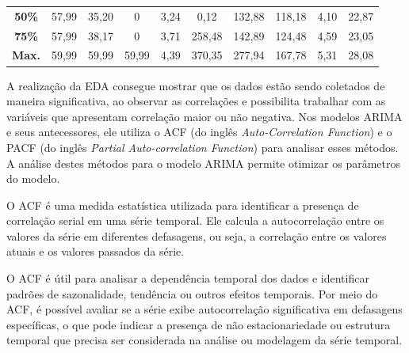 \begin{table}[!htb]
\begin{tabular}{@{}cccccccccc@{}}
\textbf{50\%}                          & 57,99                           & 35,20                           & 0                               & 3,24                              & 0,12                              & 132,88                            & 118,18                            & 4,10                              & 22,87                             \\
\textbf{75\%}                          & 57,99                           & 38,17                           & 0                               & 3,71                              & 258,48                            & 142,89                            & 124,48                            & 4,59                              & 23,05                             \\
\textbf{Max.}                          & 59,99                           & 59,99                           & 59,99                           & 4,39                              & 370,35                            & 277,94                            & 167,78                            & 5,31                              & 28,08                             \\ \bottomrule
	\end{tabular}
	
	
\end{table}



A realização da EDA consegue mostrar que os dados estão sendo coletados de maneira significativa, ao observar as correlações e possibilita trabalhar com as variáveis que apresentam correlação maior ou não negativa. Nos modelos ARIMA e seus antecessores, ele utiliza o ACF (do inglês \textit{\textit{Auto-Correlation Function}}) e o PACF (do inglês \textit{Partial Auto-correlation Function}) para analisar esses métodos. A análise destes métodos para o modelo ARIMA permite otimizar os parâmetros do modelo.

O ACF é uma medida estatística utilizada para identificar a presença de correlação serial em uma série temporal. Ele calcula a autocorrelação entre os valores da série em diferentes defasagens, ou seja, a correlação entre os valores atuais e os valores passados da série. 

O ACF é útil para analisar a dependência temporal dos dados e identificar padrões de sazonalidade, tendência ou outros efeitos temporais. Por meio do ACF, é possível avaliar se a série exibe autocorrelação significativa em defasagens específicas, o que pode indicar a presença de não estacionariedade ou estrutura temporal que precisa ser considerada na análise ou modelagem da série temporal.


